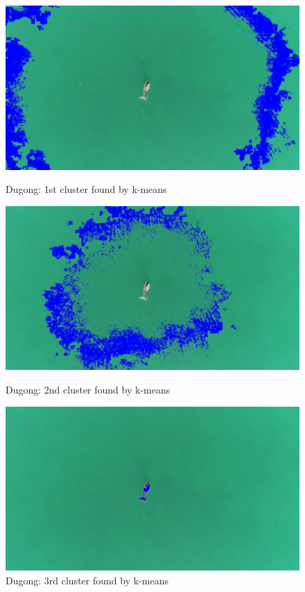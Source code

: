 \documentclass[conference]{IEEEtran}
\begin{document}
\begin{figure}[!htb]
  \centering
  \begin{minipage}[b]{0.2\textwidth}
    \includegraphics[width=\textwidth]{../programme/results/Task_4/dugong/HSV/image_1.jpg}
    \caption{Dugong: 1st cluster found by k-means}
    \label{Dugong: 1st cluster found by k-means}
  \end{minipage}
  \hfill
  \begin{minipage}[b]{0.2\textwidth}
    \includegraphics[width=\textwidth]{../programme/results/Task_4/dugong/HSV/image_2.jpg}
    \caption{Dugong: 2nd cluster found by k-means}
    \label{Dugong: 2nd cluster found by k-means}
  \end{minipage}
  \hfill
  \begin{minipage}[b]{0.2\textwidth}
    \includegraphics[width=\textwidth]{../programme/results/Task_4/dugong/HSV/image_3.jpg}
    \caption{Dugong: 3rd cluster found by k-means}
    \label{Dugong: 3rd cluster found by k-means}
  \end{minipage}
\end{figure}
\end{document}
